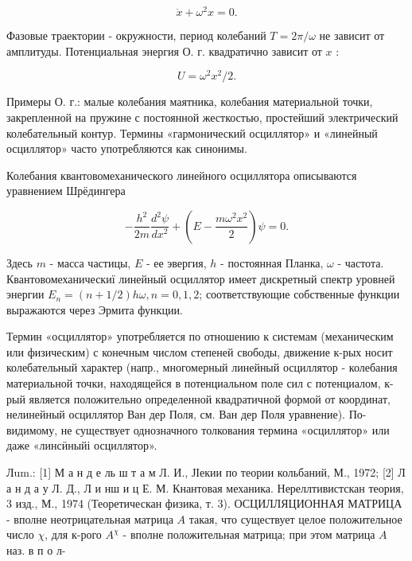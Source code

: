 \documentclass[10pt]{article}
\begin{document}
\[

\ddot{x}+\omega^{2} x=0 .

\]



Фазовые траектории - окружности, период колебаний $T=2 \pi / \omega$ не зависит от амплитуды. Потенциальная энергия О. г. квадратично зависит от $x$ :



\[

U=\omega^{2} x^{2} / 2 .

\]



Примеры О. г.: малые колебания маятника, колебания материальной точки, закрепленной на пружине с постоянной жесткостью, простейший электрический колебательный контур. Термины «гармонический осциллятор» и «линейный осциллятор» часто употребляются как синонимы.



Колебания квантовомеханического линейного осциллятора описываются уравнением Шрёдингера



\[

-\frac{h^{2}}{2 m} \frac{d^{2} \psi}{d x^{2}}+\left(E-\frac{m \omega^{2} x^{2}}{2}\right) \psi=0 .

\]



Здесь $m$ - масса частицы, $E$ - ее эвергия, $h$ - постоянная Планка, $\omega$ - частота. Квантовомеханическиї линейный осциллятор имеет дискретный спектр уровней энергии $E_{n}=(n+1 / 2) h \omega, n=0,1,2$; соответствующие собственные функции выражаются через Эрмита функции.



Термин «осциллятор» употребляется по отношению к системам (механическим или физическим) с конечным числом степеней свободы, движение к-рых носит колебательный характер (напр., многомерный линейный осциллятор - колебания материальной точки, находящейся в потенциальном поле сил с потенциалом, к-рый является положительно определенной квадратичной формой от координат, нелинейный осциллятор Ван дер Поля, см. Ван дер Поля уравнение). По-видимому, не существует однозначного толкования термина «осциллятор» или даже «линсӥныйі осциллятор».



Лum.: [1] М а н д е ль ш т а м Л. И., ЈІекии по теории кольбаний, М., 1972; [2] Л а н д а у Л. Д., Л и нш и ц Е. М. Кнантовая механика. Нереллтивистскан теория, 3 изд., М., 1974 (Теоретическан физика, т. 3). ОСЦИЛЛЯЦИОННАЯ МАТРИЦА - вполне неотрицательная матрица $A$ такая, что существует целое положительное число $\chi$, для к-рого $A^{\chi}$ - вполне положительная матрица; при этом матрица $A$ наз. в п о л-
\end{document}
